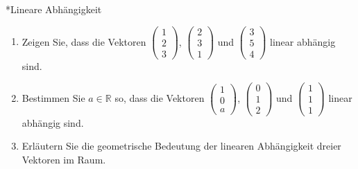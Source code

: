 \begin{uebung}*{Lineare Abhängigkeit}
\begin{enumerate}[label=\alph*)]
  \item Zeigen Sie, dass die Vektoren $\begin{pmatrix} 1\\ 2\\ 3\end{pmatrix}$, $\begin{pmatrix} 2\\ 3\\ 1\end{pmatrix}$ und $\begin{pmatrix} 3\\ 5\\ 4\end{pmatrix}$ linear abhängig sind.
  \item Bestimmen Sie $a\in\mathds{R}$ so, dass die Vektoren $\begin{pmatrix} 1\\ 0\\ a\end{pmatrix}$, $\begin{pmatrix} 0\\ 1\\ 2\end{pmatrix}$ und $\begin{pmatrix} 1\\ 1\\ 1\end{pmatrix}$ linear abhängig sind.
  \item Erläutern Sie die geometrische Bedeutung der linearen Abhängigkeit dreier Vektoren im Raum.
\end{enumerate}
\end{uebung}


